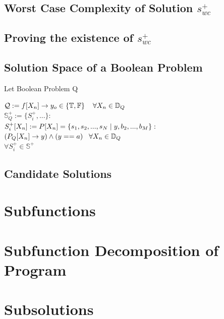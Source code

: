 \documentclass[11pt]{article}
\begin{document}
\subsection{Worst Case Complexity of Solution $s_{wc}^+$}

\subsection{Proving the existence of $s_{wc}^+$}

\subsection{Solution Space of a Boolean Problem}
Let Boolean Problem Q
\begin{center}
\vspace{1mm}
$
\mathcal{Q} := f\lbrack X_n \rbrack \rightarrow y_o \in \{\mathbb{T},\mathbb{F}\} \hspace{4mm} \forall X_n \in \mathbb{D}_{Q}
$
\\ \vspace{6mm}
$
\mathbb{S}_{Q}^+ := \{S_{i}^+,...\} :
$
\\ \vspace{2mm}
$
S^+_{i}[X_n] := P[X_n] =\{ s_1,s_2,...,s_{N}\hspace{1mm}|\hspace{1mm} y, b_2,...,b_M\} :
$
\\ \vspace{2mm}
$
(P_{Q}[X_n] \rightarrow y) \land (y == a) \hspace{3mm} \forall  X_n \in \mathbb{D}_Q
$
\\ \vspace{2mm}
$
\forall S_{i}^+ \in \mathbb{S}^+
$
\end{center}

\subsection{Candidate Solutions}

\newpage
\section{Subfunctions}
\section{Subfunction Decomposition of  Program}
\section{Subsolutions}
\end{document}
